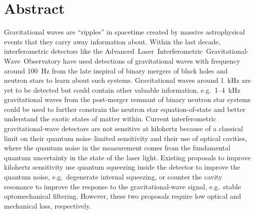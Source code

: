 \chapter*{Abstract}

Gravitational waves are ``ripples'' in spacetime created by massive astrophysical events that they carry away information about. Within the last decade, interferometric detectors like the Advanced~Laser~Interferometric~Gravitational-Wave~Observatory have used detections of gravitational waves with frequency around 100~Hz from the late inspiral of binary mergers of black holes and neutron stars to learn about such systems.
Gravitational waves around 1~kHz are yet to be detected but could contain other valuable information, e.g.\ 1--4~kHz gravitational waves from the post-merger remnant of binary neutron star systems could be used to further constrain the neutron star equation-of-state and better understand the exotic states of matter within.
Current interferometric gravitational-wave detectors are not sensitive at kilohertz because of a classical limit on their quantum noise--limited sensitivity and their use of optical cavities, where the quantum noise in the measurement comes from the fundamental quantum uncertainty in the state of the laser light. Existing proposals to improve kilohertz sensitivity use quantum squeezing inside the detector to improve the quantum noise, e.g.\ degenerate internal squeezing, or counter the cavity resonance to improve the response to the gravitational-wave signal, e.g.\ stable optomechanical filtering. However, these two proposals require low optical and mechanical loss, respectively.

